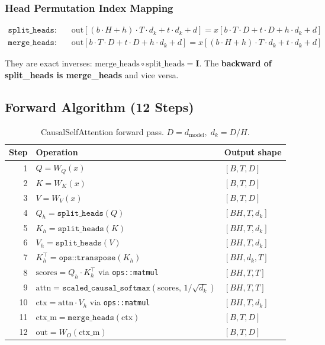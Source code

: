 \documentclass[12pt, a4paper]{article}
\begin{document}
\subsubsection{Head Permutation Index Mapping}

\begin{align*}
\texttt{split\_heads}: \quad &
  \text{out}[(b \cdot H + h) \cdot T \cdot d_k + t \cdot d_k + d]
  = x[b \cdot T \cdot D + t \cdot D + h \cdot d_k + d] \\
\texttt{merge\_heads}: \quad &
  \text{out}[b \cdot T \cdot D + t \cdot D + h \cdot d_k + d]
  = x[(b \cdot H + h) \cdot T \cdot d_k + t \cdot d_k + d]
\end{align*}

They are exact inverses: \(\text{merge\_heads} \circ \text{split\_heads} = \mathbf{I}\).
The \textbf{backward of split\_heads is merge\_heads} and vice versa.

\subsection{Forward Algorithm (12 Steps)}

\begin{table}[!ht]
\centering
\renewcommand{\arraystretch}{1.35}
\begin{tabularx}{\textwidth}{@{} r l L @{}}
\toprule
\textbf{Step} & \textbf{Operation} & \textbf{Output shape} \\
  & \(Q = W_Q(x)\)                    & \([B,T,D]\) \\
2  & \(K = W_K(x)\)                    & \([B,T,D]\) \\
3  & \(V = W_V(x)\)                    & \([B,T,D]\) \\
4  & \(Q_h = \texttt{split\_heads}(Q)\) & \([BH,T,d_k]\) \\
5  & \(K_h = \texttt{split\_heads}(K)\) & \([BH,T,d_k]\) \\
6  & \(V_h = \texttt{split\_heads}(V)\) & \([BH,T,d_k]\) \\
7  & \(K_h^{\top} = \texttt{ops::transpose}(K_h)\) & \([BH,d_k,T]\) \\
8  & \(\text{scores} = Q_h \cdot K_h^{\top}\) via \texttt{ops::matmul} & \([BH,T,T]\) \\
9  & \(\text{attn} = \texttt{scaled\_causal\_softmax}(\text{scores},\,1/\sqrt{d_k})\) & \([BH,T,T]\) \\
10 & \(\text{ctx} = \text{attn} \cdot V_h\) via \texttt{ops::matmul}  & \([BH,T,d_k]\) \\
11 & \(\text{ctx\_m} = \texttt{merge\_heads}(\text{ctx})\)            & \([B,T,D]\) \\
12 & \(\text{out} = W_O(\text{ctx\_m})\)                              & \([B,T,D]\) \\
\bottomrule
\end{tabularx}
\caption{CausalSelfAttention forward pass.  \(D = d_{\text{model}},\; d_k = D/H\).}
\end{table}
\end{document}
